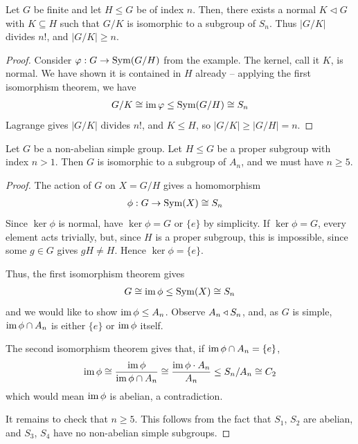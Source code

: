 \documentclass{../template/note}
\begin{document}
    \begin{theorem}
        Let $G$ be finite and let $H \leq G$ be of index $n$. Then, there exists a normal $K \triangleleft G$ with $K \subseteq H$ such that $G/K$ is isomorphic to a subgroup of $S_n$. Thus $|G/K|$ divides $n!$, and $|G/K| \geq n$.
    \end{theorem}
    
    \begin{proof}
        Consider $\varphi: G \to \operatorname{Sym}(G/H)$ from the example. The kernel, call it $K$, is normal. We have shown it is contained in $H$ already -- applying the first isomorphism theorem, we have
        \begin{align*}
            G/K \cong \operatorname{im} \varphi \leq \operatorname{Sym}(G/H) \cong S_n
        \end{align*}
        Lagrange gives $|G/K|$ divides $n!$, and $K \leq H$, so $|G/K| \geq |G/H| = n$.
    \end{proof}
    
    \begin{corollary}
        Let $G$ be a non-abelian simple group. Let $H \leq G$ be a proper subgroup with index $n > 1$. Then $G$ is isomorphic to a subgroup of $A_n$, and we must have $n \geq 5$.
    \end{corollary}


    \begin{proof}
        The action of $G$ on $X = G/H$ gives a homomorphism
        \begin{align*}
            \phi: G &\to \operatorname{Sym}(X) \cong S_n
        \end{align*}
        Since $\ker \phi$ is normal, have $\ker \phi = G$ or $\{e\}$ by simplicity. If $\ker \phi = G$, every element acts trivially, but, since $H$ is a proper subgroup, this is impossible, since some $g \in G$ gives $gH \neq H$. Hence $\ker \phi = \{e\}$.

        Thus, the first isomorphism theorem gives
        \begin{align*}
            G \cong \operatorname{im} \phi \leq \operatorname{Sym}(X) \cong S_n
        \end{align*}
        and we would like to show $\operatorname{im} \phi \leq A_n$. Observe $A_n \triangleleft S_n$, and, as $G$ is simple, $\operatorname{im} \phi \cap A_n$ is either $\{e\}$ or $\operatorname{im} \phi$ itself.

        The second isomorphism theorem gives that, if $\operatorname{im} \phi \cap A_n = \{e\}$,
        \begin{align*}
            \operatorname{im} \phi \cong \frac{\operatorname{im} \phi}{\operatorname{im} \phi \cap A_n} \cong \frac{\operatorname{im} \phi \cdot A_n}{A_n} \leq S_n/A_n \cong C_2
        \end{align*}
        which would mean $\operatorname{im} \phi$ is abelian, a contradiction.

        It remains to check that $n \geq 5$. This follows from the fact that $S_1$, $S_2$ are abelian, and $S_3$, $S_4$ have no non-abelian simple subgroups.
    \end{proof}
    
\end{document}
